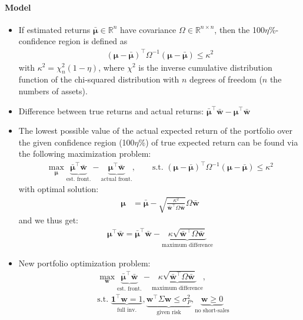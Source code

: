 \documentclass[a4paper,landscape,8pt,fleqn]{scrartcl}
\begin{document}
\begin{multicols*}{3}
\paragraph{Model}
\begin{itemize}
\item If estimated returns $\bm{\bar \mu} \in \mathbb{R}^n$ have covariance $\Omega \in \mathbb{R}^{n \times n}$, then the 100$\eta$\%-confidence region is defined as
\begin{align*}
(\bm \mu - \bm{\bar \mu})^\top \Omega^{-1} (\bm \mu - \bm{\bar \mu}) \leq \kappa^2
\end{align*}
with $\kappa^2 = \chi_n^2 (1-\eta)$, where $\chi^2$ is the inverse cumulative distribution function of the chi-squared distribution with $n$ degrees of freedom ($n$ the numbers of assets).
\item Difference between true returns and actual returns: $\bm{\bar \mu}^\top \bm{\bar w} - \bm \mu^\top \bm{\bar w}$
\item The lowest possible value of the actual expected return of the portfolio over the given confidence region (100$\eta$\%) of true expected return can be found via the following maximization problem:
\begin{align*}
\max_{\bm \mu} \underbrace{\bm{\bar \mu}^\top \bm{\bar w}}_\text{est. front.} - \underbrace{\bm \mu^\top \bm{\bar w}}_\text{actual front.},
\qquad \text{s.t. } (\bm \mu - \bm{\bar \mu})^\top \Omega^{-1} (\bm \mu - \bm{\bar \mu}) \leq \kappa^2
\end{align*}
with optimal solution:
\begin{align*}
\bm \mu &= \bm{\bar \mu} - \sqrt{\frac{\kappa^2}{\bm{\bar w}^\top \Omega \bm{\bar w}}} \Omega \bm{\bar w}
\end{align*}
and we thus get:
\begin{align*}
\bm \mu^\top \bm{\bar w} = \bm{\bar \mu}^\top \bm{\bar w} - \underbrace{\kappa \sqrt{\bm{\bar w}^\top \Omega \bm{\bar w}}}_\text{maximum difference}
\end{align*}
\item New portfolio optimization problem:
\begin{align*}
&\max_{\bm w} \underbrace{\bm{\bar \mu}^\top \bm{\bar w}}_\text{est. front.} - \underbrace{\kappa \sqrt{\bm{\bar w}^\top \Omega \bm{\bar w}}}_\text{maximum difference}, \\
&\text{s.t. } \underbrace{\bm 1^\top \bm w = 1}_\text{full inv.}, \underbrace{\bm w^\top \Sigma \bm w \leq \sigma_P^2}_\text{given risk}, \underbrace{\bm w \geq 0}_\text{no short-sales}
\end{align*}
\end{itemize}


\end{multicols*}
\end{document}

